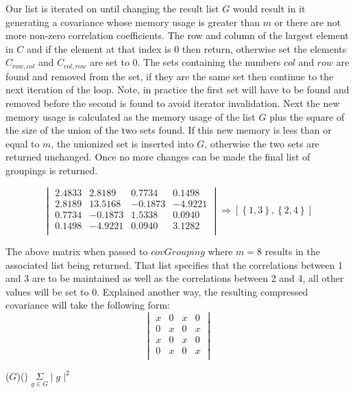 \documentclass[11pt]{article}
\begin{document}
Our list is iterated on until changing the result list $G$ would result in it generating a covariance whose memory usage is greater than $m$ or there are not more non-zero correlation coefficients.
The row and column of the largest element in $C$ and if the element at that index is $0$ then return, otherwise set the elements $C_{row,col}$ and $C_{col,row}$ are set to $0$.  
The sets containing the numbers $col$ and $row$ are found and removed from the set, if they are the same set then continue to the next iteration of the loop. 
Note, in practice the first set will have to be found and removed before the second is found to avoid iterator invalidation. 
Next the new memory usage is calculated as the memory usage of the list $G$ plus the square of the size of the union of the two sets found. 
If this new memory is less than or equal to $m$, the unionized set is inserted into $G$, otherwise the two sets are returned unchanged. 
Once no more changes can be made the final list of groupings is returned. 

\begin{figure}[h]
$$
\begin{vmatrix}
	2.4833 & 2.8189  &  0.7734  &  0.1498 \\
    2.8189 & 13.5168 & -0.1873  & -4.9221 \\
    0.7734 & -0.1873 &  1.5338  &  0.0940 \\
    0.1498 & -4.9221 &  0.0940  &  3.1282 \\
\end{vmatrix}
\Rightarrow 
\left[\left\{1,3\right\},\left\{2,4\right\}\right]
$$
\end{figure}

The above matrix when passed to $covGrouping$ where $m = 8$ results in the associated list being returned. 
That list specifies that the correlations between 1 and 3 are to be maintained as well as the correlations between 2 and 4, all other values will be set to $0$. 
Explained another way, the resulting compressed covariance will take the following form:
$$
\begin{vmatrix}
	x & 0 & x & 0 \\
	0 & x & 0 & x \\
	x & 0 & x & 0 \\
	0 & x & 0 & x \\
\end{vmatrix}
$$

\begin{algorithm}

\memoryUsage($G$)\Begin() {
	\Return $\underset{g \in G}{\Sigma}\mid g \mid^2$
}
	
\end{algorithm}
\end{document}
